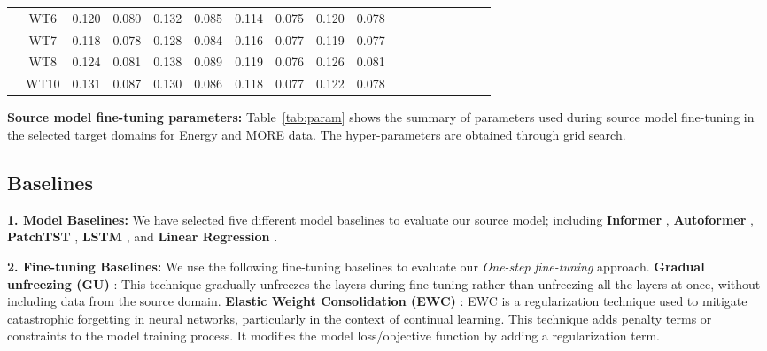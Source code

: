 \documentclass[letterpaper]{article} %
\begin{document}
\begin{table*}[t!]
\begin{tabular}{|c|c|cccccccc|llllllll}
 & WT6 & \multicolumn{1}{c|}{0.120} & \multicolumn{1}{c|}{0.080} & \multicolumn{1}{c|}{0.132} & \multicolumn{1}{c|}{0.085} & \multicolumn{1}{c|}{0.114} & \multicolumn{1}{c|}{0.075} & \multicolumn{1}{c|}{0.120} & 0.078 & \multicolumn{1}{c}{} &  &  &  &  &  &  &  \\ \cline{2-10}
 & WT7 & \multicolumn{1}{c|}{0.118} & \multicolumn{1}{c|}{0.078} & \multicolumn{1}{c|}{0.128} & \multicolumn{1}{c|}{0.084} & \multicolumn{1}{c|}{0.116} & \multicolumn{1}{c|}{0.077} & \multicolumn{1}{c|}{0.119} & 0.077 & \multicolumn{1}{c}{} &  &  &  &  &  &  &  \\ \cline{2-10}
 & WT8 & \multicolumn{1}{c|}{0.124} & \multicolumn{1}{c|}{0.081} & \multicolumn{1}{c|}{0.138} & \multicolumn{1}{c|}{0.089} & \multicolumn{1}{c|}{0.119} & \multicolumn{1}{c|}{0.076} & \multicolumn{1}{c|}{0.126} & 0.081 & \multicolumn{1}{c}{} &  &  &  &  &  &  &  \\ \cline{2-10}
 & WT10 & \multicolumn{1}{c|}{0.131} & \multicolumn{1}{c|}{0.087} & \multicolumn{1}{c|}{0.130} & \multicolumn{1}{c|}{0.086} & \multicolumn{1}{c|}{0.118} & \multicolumn{1}{c|}{0.077} & \multicolumn{1}{c|}{0.122} & 0.078 & \multicolumn{1}{c}{} &  &  &  &  &  &  &  \\ \cline{1-10}
\end{tabular}
\end{table*}

\textbf{Source model fine-tuning parameters:} Table~\ref{tab:param} shows the summary of parameters used during source model fine-tuning in the selected target domains for Energy and MORE data. The hyper-parameters are obtained through grid search.

\subsection{Baselines}
\hspace{0.12in}\textbf{1. Model Baselines:} We have selected five different model baselines to evaluate our source model; including \textbf{Informer} \cite{zhou2021informer}, \textbf{Autoformer} \cite{wu2021autoformer}, \textbf{PatchTST }\cite{nie2022time}, \textbf{LSTM }\cite{staudemeyer2019understanding}, and \textbf{Linear Regression} \cite{liu2021forecast,james2023linear}.

\textbf{2. Fine-tuning Baselines:} We use the following fine-tuning baselines to evaluate our \emph{One-step fine-tuning} approach. \textbf{Gradual unfreezing (GU)} \cite{howard2018universal}: This technique gradually unfreezes the layers during fine-tuning rather than unfreezing all the layers at once, without including data from the source domain.
\textbf{Elastic Weight Consolidation (EWC)} \cite{barone2017regularization, kirkpatrick2017overcoming}: EWC is a regularization technique used to mitigate catastrophic forgetting in neural networks, particularly in the context of continual learning. This technique adds penalty terms or constraints to the model training process. It modifies the model loss/objective function by adding a regularization term.
\end{document}

